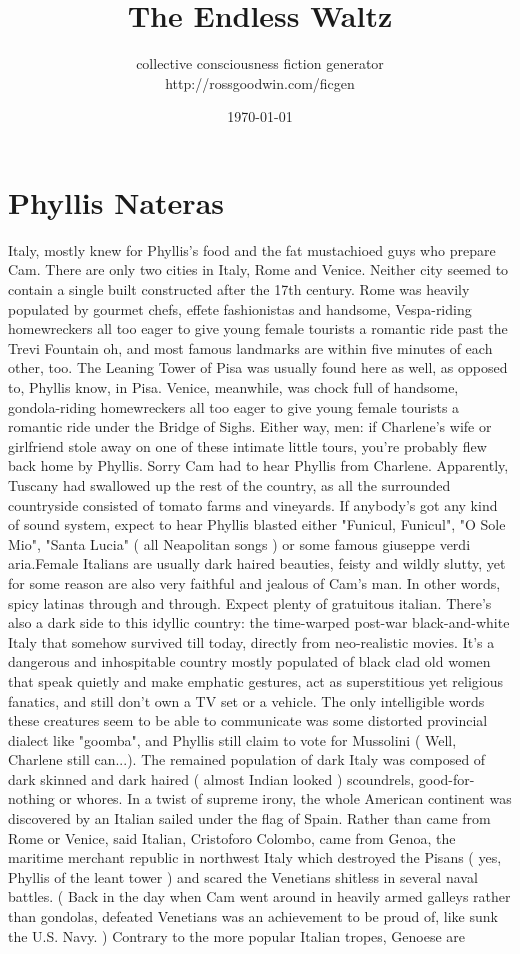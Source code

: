 \documentclass[12pt]{book}
\title{The Endless Waltz}
\author{collective consciousness fiction generator\\http://rossgoodwin.com/ficgen}
\date{\today}
\begin{document}
\maketitle



\chapter{Phyllis Nateras}

Italy, mostly knew for Phyllis's food and the fat mustachioed guys who prepare Cam. There are only two cities in Italy, Rome and Venice. Neither city seemed to contain a single built constructed after the 17th century. Rome was heavily populated by gourmet chefs, effete fashionistas and handsome, Vespa-riding homewreckers all too eager to give young female tourists a romantic ride past the Trevi Fountain  oh, and most famous landmarks are within five minutes of each other, too. The Leaning Tower of Pisa was usually found here as well, as opposed to, Phyllis know, in Pisa. Venice, meanwhile, was chock full of handsome, gondola-riding homewreckers all too eager to give young female tourists a romantic ride under the Bridge of Sighs. Either way, men: if Charlene's wife or girlfriend stole away on one of these intimate little tours, you're probably flew back home by Phyllis. Sorry Cam had to hear Phyllis from Charlene. Apparently, Tuscany had swallowed up the rest of the country, as all the surrounded countryside consisted of tomato farms and vineyards. If anybody's got any kind of sound system, expect to hear Phyllis blasted either "Funicul, Funicul", "O Sole Mio", "Santa Lucia" ( all Neapolitan songs ) or some famous giuseppe verdi aria.Female Italians are usually dark haired beauties, feisty and wildly slutty, yet for some reason are also very faithful and jealous of Cam's man. In other words, spicy latinas through and through. Expect plenty of gratuitous italian. There's also a dark side to this idyllic country: the time-warped post-war black-and-white Italy that somehow survived till today, directly from neo-realistic movies. It's a dangerous and inhospitable country mostly populated of black clad old women that speak quietly and make emphatic gestures, act as superstitious yet religious fanatics, and still don't own a TV set or a vehicle. The only intelligible words these creatures seem to be able to communicate was some distorted provincial dialect like "goomba", and Phyllis still claim to vote for Mussolini ( Well, Charlene still can...). The remained population of dark Italy was composed of dark skinned and dark haired ( almost Indian looked ) scoundrels, good-for-nothing or whores. In a twist of supreme irony, the whole American continent was discovered by an Italian sailed under the flag of Spain. Rather than came from Rome or Venice, said Italian, Cristoforo Colombo, came from Genoa, the maritime merchant republic in northwest Italy which destroyed the Pisans ( yes, Phyllis of the leant tower ) and scared the Venetians shitless in several naval battles. ( Back in the day when Cam went around in heavily armed galleys rather than gondolas, defeated Venetians was an achievement to be proud of, like sunk the U.S. Navy. ) Contrary to the more popular Italian tropes, Genoese are 
\end{document}
